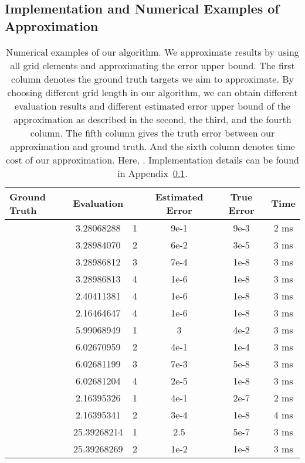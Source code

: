 \documentclass[nohyperref]{article}
\theoremstyle{plain}
\theoremstyle{definition}
\theoremstyle{remark}
\begin{document}
\subsection{Implementation and Numerical Examples of Approximation}
\label{example}

\begin{table}[t]
\caption{Numerical examples of our algorithm. We approximate results by using all grid elements and approximating the error upper bound. The first column denotes the ground truth targets we aim to approximate. By choosing different grid length  in our algorithm, we can obtain different evaluation results and different estimated error upper bound of the approximation as described in the second, the third, and the fourth column. The fifth column gives the truth error between our approximation and ground truth. And the sixth column denotes time cost of our approximation. Here, . Implementation details can be found in Appendix~\ref{example}.}
\label{table:algorithm}
\begin{center}
\begin{tabular}{lccccc}
\toprule
Ground Truth  & Evaluation &  & Estimated Error & True Error & Time \\ 
\midrule
 & 3.28068288 & 1 & 9e-1 & 9e-3 & 2 ms \\
 & 3.28984070 & 2 & 6e-2 & 3e-5 & 3 ms \\
 & 3.28986812 & 3 & 7e-4 & 1e-8 & 3 ms \\
 & 3.28986813 & 4 & 1e-6 &  1e-8 & 3 ms \\
 & 2.40411381 & 4 & 1e-6 &  1e-8 & 3 ms \\
 & 2.16464647 & 4 & 1e-6 &  1e-8 & 3 ms \\
 & 5.99068949 & 1 & 3 & 4e-2 & 3 ms\\
 & 6.02670959 & 2 & 4e-1 & 1e-4 & 3 ms\\
 & 6.02681199 & 3 & 7e-3 & 5e-8 & 3 ms\\
 & 6.02681204 & 4 & 2e-5 &  1e-8  & 3 ms\\
 & 2.16395326 & 1 & 4e-1 & 2e-7 & 2 ms\\
 & 2.16395341 & 2 & 3e-4 &  1e-8 & 4 ms\\
 & 25.39268214 & 1 & 2.5 & 5e-7 & 3 ms\\
 & 25.39268269 & 2 & 1e-2 &  1e-8 & 3 ms \\
\bottomrule
\end{tabular}
\end{center}
\end{table}
\end{document}
